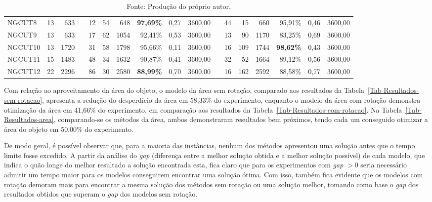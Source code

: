 \documentclass[10pt, a4paper]{article}
\begin{document}
\begin{table}[H]
{\begin{tabular}{l *{16}{r}}
                    NGCUT8  & 13 &  633     && 12 & 54 &  648 & \textbf{97,69\%} & 0,27 & 3600,00   && 44 &  15 &  660 &          95,91\% & 0,46 & 3600,00    \\
                    NGCUT9  & 13 &  633     && 17 & 62 & 1054 &          92,41\% & 0,53 & 3600,00   && 13 &  90 & 1170 &          83,25\% & 0,69 & 3600,00    \\
                    NGCUT10 & 13 & 1720     && 31 & 58 & 1798 &          95,66\% & 0,11 & 3600,00   && 16 & 109 & 1744 & \textbf{98,62\%} & 0,43 & 3600,00    \\
                    NGCUT11 & 15 & 1483     && 48 & 34 & 1632 &          90,87\% & 0,41 & 3600,00   && 32 &  52 & 1664 &          89,12\% & 0,56 & 3600,00    \\
                    NGCUT12 & 22 & 2296     && 86 & 30 & 2580 & \textbf{88,99\%} & 0,70 & 3600,00   && 16 & 162 & 2592 &          88,58\% & 0,77 & 3600,00    \\
                    \bottomrule
                \end{tabular}
            }
            \caption*{Fonte: Produção do próprio autor.}    %
        \end{table}
    
        Com relação ao aproveitamento da área do objeto, o modelo da área sem rotação, comparado aos resultados da Tabela~\ref{Tab-Resultados-sem-rotacao}, apresenta a redução do desperdício da área em 58,33\% do experimento, enquanto o modelo da área com rotação demonstra otimização da área em 41,66\% do experimento, em comparação aos resultados da Tabela~\ref{Tab-Resultados-com-rotacao}. Na Tabela~\ref{Tab-Resultados-area}, comparando-se os métodos da área, ambos demonstraram resultados bem próximos, tendo cada um conseguido otimizar a área do objeto em 50,00\% do experimento.
    
        De modo geral, é possível observar que, para a maioria das instâncias, nenhum dos métodos apresentou uma solução antes que o tempo limite fosse excedido. A partir da análise do \emph{gap} (diferença entre a melhor solução obtida e a melhor solução possível) de cada modelo, que indica o quão longe do melhor resultado a solução encontrada esta, fica claro que para os experimentos com \emph{gap} ${> 0}$ seria necessário admitir um tempo maior para os modelos conseguirem encontrar uma solução ótima. Com isso, também fica evidente que os modelos com rotação demoram mais para encontrar a mesma solução dos métodos sem rotação ou uma solução melhor, tomando como base o \emph{gap} dos resultados obtidos que superam o \emph{gap} dos modelos sem rotação.
\end{document}
